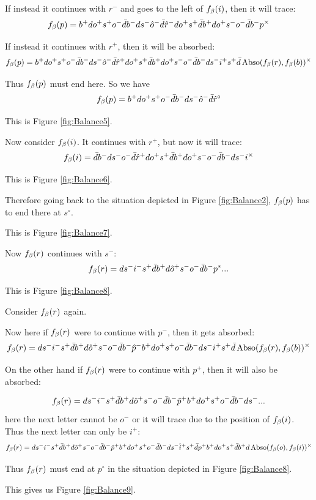 If instead it continues with $r^-$ and goes to the left of $f_\beta(i)$, then it will trace:
\[
f_\beta(p) = b^+ d o^+ s^+ o^- \bar{d} b^- d s^- \hat{o}^- \bar{d} \hat{r}^- d o^+ s^+ \bar{d} b^+ d o^+ s^- o^- \bar{d} b^- p^\times
\]

If instead it continues with $r^+$, then it will be absorbed:
\[
f_\beta(p) = b^+ d o^+ s^+ o^- \bar{d} b^- d s^- \hat{o}^- \bar{d} \hat{r}^+ d o^+ s^+ \bar{d} b^+ d o^+s^- o^- \bar{d} b^- d s^- i^+ s^+ \bar{d} \operatorname{Abso}(f_\beta(r), f_\beta(b))^\times
\]

Thus $f_\beta(p)$ must end here. So we have
\[
f_\beta(p) = b^+ d o^+ s^+ o^- \bar{d} b^- d s^- \hat{o}^- \bar{d} \hat{r}^\circ
\]

This is Figure \ref{fig:Balance5}.

Now consider $f_\beta(i)$. It continues with $r^+$, but now it will trace:
\[
f_\beta(i) = \bar{d} b^- d s^- o^- \bar{d} \hat{r}^+ d o^+ s^+ \bar{d} b^+ d o^+ s^- o^-\bar{d} b^- d s^- i^\times 
\]


This is Figure \ref{fig:Balance6}.


Therefore going back to the situation depicted in Figure \ref{fig:Balance2}, $f_\beta(p)$ has to end there at $s^\circ$. 

This is Figure \ref{fig:Balance7}.

Now $f_\beta(r)$ continues with $s^-$:
\[
f_\beta(r)= d s^- i^- s^+ \bar{d} b^+ d \hat{o}^+ s^- o^-\bar{d} b^- p^*...
\]

This is Figure \ref{fig:Balance8}.


Consider $f_\beta(r)$ again. 

Now here if $f_\beta(r)$ were to continue with $p^-$, then it gets absorbed:
\[
f_\beta(r)= d s^- i^- s^+ \bar{d} b^+ d \hat{o}^+ s^- o^-\bar{d} b^- \hat{p}^- b^+ d o^+ s^+ o^- \bar{d} b^- d s^- i^+ s^+ \bar{d} \operatorname{Abso}(f_\beta(r), f_\beta(b))^\times
\]

On the other hand if $f_\beta(r)$ were to continue with $p^+$, then it will also be absorbed:

\[
f_\beta(r)= d s^- i^- s^+ \bar{d} b^+ d \hat{o}^+ s^- o^-\bar{d} b^- \hat{p}^+ b^+ d o^+ s^+ o^- \bar{d} b^- d s^-...
\]
here the next letter cannot be $o^-$ or it will trace due to the position of $f_\beta(i)$. Thus the next letter can only be $i^+$:
\[
f_\beta(r)= d s^- i^- s^+ \bar{d} b^+ d \hat{o}^+ s^- o^-\bar{d} b^- \hat{p}^+ b^+ d o^+ s^+ o^- \bar{d} b^- d s^- \hat{i}^+ s^+ \bar{d} p^+ b^+ d o^+ s^+ \bar{d} b^+ d \operatorname{Abso}(f_\beta(o), f_\beta(i))^\times
\]


Thus $f_\beta(r)$ must end at $p^\circ$ in the situation depicted in Figure \ref{fig:Balance8}.

This gives us Figure \ref{fig:Balance9}.

